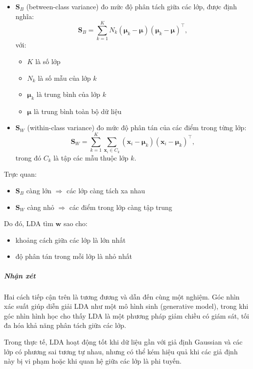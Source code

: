 \begin{itemize}
  \item $\boldsymbol{S}_B$ (between-class variance) đo mức độ phân tách
  giữa các lớp, được định nghĩa:
  \begin{equation}
    \boldsymbol{S}_B =
    \sum_{k=1}^{K} N_k
    (\boldsymbol{\mu}_k - \boldsymbol{\mu})
    (\boldsymbol{\mu}_k - \boldsymbol{\mu})^\intercal,
  \end{equation}
  với:
  \begin{itemize}
    \item $K$ là số lớp
    \item $N_k$ là số mẫu của lớp $k$
    \item $\boldsymbol{\mu}_k$ là trung bình của lớp $k$
    \item $\boldsymbol{\mu}$ là trung bình toàn bộ dữ liệu
  \end{itemize}

  \item $\boldsymbol{S}_W$ (within-class variance) đo mức độ phân tán
  của các điểm trong từng lớp:
  \begin{equation}
    \boldsymbol{S}_W =
    \sum_{k=1}^{K} \sum_{\boldsymbol{x}_i \in C_k}
    (\boldsymbol{x}_i - \boldsymbol{\mu}_k)
    (\boldsymbol{x}_i - \boldsymbol{\mu}_k)^\intercal,
  \end{equation}
  trong đó $C_k$ là tập các mẫu thuộc lớp $k$.
\end{itemize}

Trực quan:
\begin{itemize}
  \item $\boldsymbol{S}_B$ càng lớn $\Rightarrow$ các lớp càng tách xa nhau
  \item $\boldsymbol{S}_W$ càng nhỏ $\Rightarrow$ các điểm trong lớp càng
  tập trung
\end{itemize}

Do đó, LDA tìm $\boldsymbol{w}$ sao cho:
\begin{itemize}
  \item khoảng cách giữa các lớp là lớn nhất
  \item độ phân tán trong mỗi lớp là nhỏ nhất
\end{itemize}

\subparagraph{Nhận xét}

Hai cách tiếp cận trên là tương đương và dẫn đến cùng một nghiệm. Góc nhìn xác
suất giúp diễn giải LDA như một mô hình sinh (generative model), trong khi góc
nhìn hình học cho thấy LDA là một phương pháp giảm chiều có giám sát, tối đa
hóa khả năng phân tách giữa các lớp.

Trong thực tế, LDA hoạt động tốt khi dữ liệu gần với giả định Gaussian và các
lớp có phương sai tương tự nhau, nhưng có thể kém hiệu quả khi các giả định
này bị vi phạm hoặc khi quan hệ giữa các lớp là phi tuyến.
